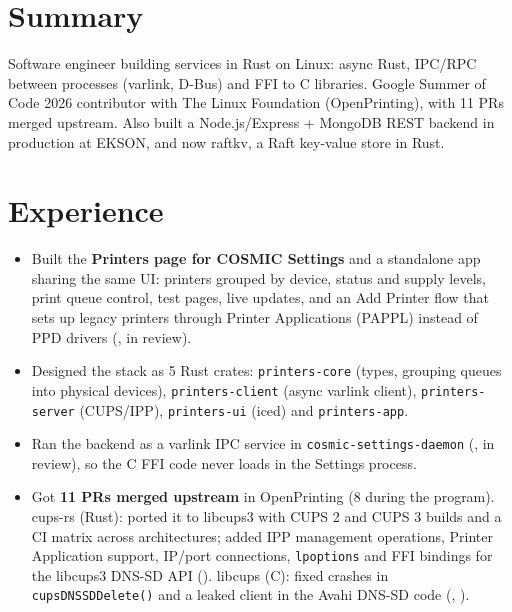 \documentclass[10pt]{article}
\begin{document}

\section*{Summary}
Software engineer building services in Rust on Linux: async Rust, IPC/RPC between processes (varlink, D-Bus) and FFI to C libraries. Google Summer of Code 2026 contributor with The Linux Foundation (OpenPrinting), with 11 PRs merged upstream. Also built a Node.js/Express + MongoDB REST backend in production at EKSON, and now raftkv, a Raft key-value store in Rust.

\section*{Experience}
\begin{itemize}
  \item Built the \textbf{Printers page for COSMIC Settings} and a standalone app sharing the same UI: printers grouped by device, status and supply levels, print queue control, test pages, live updates, and an Add Printer flow that sets up legacy printers through Printer Applications (PAPPL) instead of PPD drivers (, in review).
  \item Designed the stack as 5 Rust crates: \texttt{printers-core} (types, grouping queues into physical devices), \texttt{printers-client} (async varlink client), \texttt{printers-server} (CUPS/IPP), \texttt{printers-ui} (iced) and \texttt{printers-app}.
  \item Ran the backend as a varlink IPC service in \texttt{cosmic-settings-daemon} (, in review), so the C FFI code never loads in the Settings process.
  \item Got \textbf{11 PRs merged upstream} in OpenPrinting (8 during the program). cups-rs (Rust): ported it to libcups3 with CUPS 2 and CUPS 3 builds and a CI matrix across architectures; added IPP management operations, Printer Application support, IP/port connections, \texttt{lpoptions} and FFI bindings for the libcups3 DNS-SD API (). libcups (C): fixed crashes in \texttt{cupsDNSSDDelete()} and a leaked client in the Avahi DNS-SD code (, ).
\end{itemize}
\end{document}
